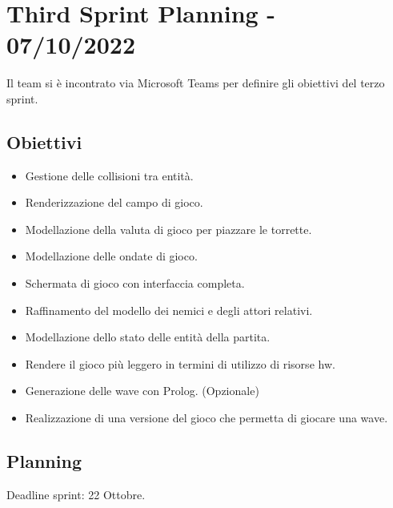 \section{Third Sprint Planning - 07/10/2022}
Il team si è incontrato via Microsoft Teams per definire gli obiettivi del terzo sprint.

\subsection{Obiettivi}
\begin{itemize}
    \item Gestione delle collisioni tra entità.
    \item Renderizzazione del campo di gioco.
    \item Modellazione della valuta di gioco per piazzare le torrette.
    \item Modellazione delle ondate di gioco.
    \item Schermata di gioco con interfaccia completa.
    \item Raffinamento del modello dei nemici e degli attori relativi.
    \item Modellazione dello stato delle entità della partita.
    \item Rendere il gioco più leggero in termini di utilizzo di risorse hw.
    \item Generazione delle wave con Prolog. (Opzionale)
    \item Realizzazione di una versione del gioco che permetta di giocare una wave.
\end{itemize}

\subsection{Planning}
Deadline sprint: 22 Ottobre.


